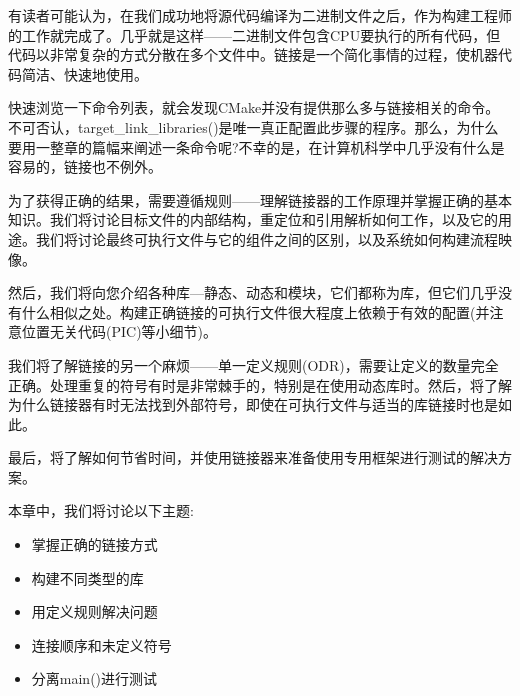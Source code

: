 有读者可能认为，在我们成功地将源代码编译为二进制文件之后，作为构建工程师的工作就完成了。几乎就是这样——二进制文件包含CPU要执行的所有代码，但代码以非常复杂的方式分散在多个文件中。链接是一个简化事情的过程，使机器代码简洁、快速地使用。

快速浏览一下命令列表，就会发现CMake并没有提供那么多与链接相关的命令。不可否认，target\_link\_libraries()是唯一真正配置此步骤的程序。那么，为什么要用一整章的篇幅来阐述一条命令呢?不幸的是，在计算机科学中几乎没有什么是容易的，链接也不例外。

为了获得正确的结果，需要遵循规则——理解链接器的工作原理并掌握正确的基本知识。我们将讨论目标文件的内部结构，重定位和引用解析如何工作，以及它的用途。我们将讨论最终可执行文件与它的组件之间的区别，以及系统如何构建流程映像。

然后，我们将向您介绍各种库—静态、动态和模块，它们都称为库，但它们几乎没有什么相似之处。构建正确链接的可执行文件很大程度上依赖于有效的配置(并注意位置无关代码(PIC)等小细节)。

我们将了解链接的另一个麻烦——单一定义规则(ODR)，需要让定义的数量完全正确。处理重复的符号有时是非常棘手的，特别是在使用动态库时。然后，将了解为什么链接器有时无法找到外部符号，即使在可执行文件与适当的库链接时也是如此。

最后，将了解如何节省时间，并使用链接器来准备使用专用框架进行测试的解决方案。

本章中，我们将讨论以下主题:

\begin{itemize}
\item 
掌握正确的链接方式

\item 
构建不同类型的库

\item 
用定义规则解决问题

\item 
连接顺序和未定义符号

\item 
分离main()进行测试
\end{itemize}
